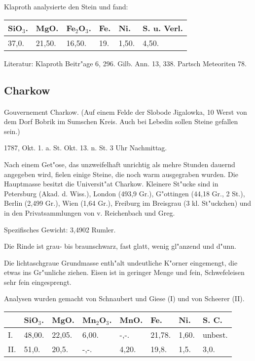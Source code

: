 \documentclass[a4paper, 11pt, oneside]{article}
\begin{document}
Klaproth analysierte den Stein und fand:
\begin{table}[!ht]
    \centering
    \begin{tabular}{l l l l l l}
        SiO$_{3}$. & MgO. & Fe$_{2}$O$_{3}$. & Fe. & Ni. & S. u. Verl. \\ \hline
        37,0. & 21,50. & 16,50. & 19. & 1,50. & 4,50. \\
    \end{tabular}
\end{table}

\footnotesize
Literatur: Klaproth Beitr"age 6, 296. Gilb. Ann. 13, 338. Partsch Meteoriten 78.
\subsection{Charkow}
\normalsize
\paragraph{}
Gouvernement Charkow. (Auf einem Felde der Slobode Jigalowka, 10 Werst von dem Dorf Bobrik im Sumschen Kreis. Auch bei Lebedin sollen Steine gefallen sein.)

1787, Okt. 1. a. St. Okt. 13. n. St. 3 Uhr Nachmittag.

Nach einem Get"ose, das unzweifelhaft unrichtig als mehre Stunden dauernd angegeben wird, fielen einige Steine, die noch warm ausgegraben wurden. Die Hauptmasse besitzt die Universit"at Charkow. Kleinere St"ucke sind in Petersburg (Akad. d. Wiss.), London (493,9 Gr.), G"ottingen (44,18 Gr., 2 St.), Berlin (2,499 Gr.), Wien (1,64 Gr.), Freiburg im Breisgrau (3 kl. St"uckchen) und in den Privatsammlungen von v. Reichenbach und Greg.

Spezifisches Gewicht: 3,4902 Rumler.

Die Rinde ist grau- bis braunschwarz, fast glatt, wenig gl"anzend und d"unn.

Die lichtaschgraue Grundmasse enth"alt undeutliche K"orner eingemengt, die etwas ins Gr"unliche ziehen. Eisen ist in geringer Menge und fein, Schwefeleisen sehr fein eingesprengt.

Analysen wurden gemacht von Schnaubert und Giese (I) und von Scheerer (II).
\begin{table}[!ht]
    \centering
    \begin{tabular}{l l l l l l l l}
         & SiO$_{3}$. & MgO. & Mn$_{2}$O$_{3}$. & MnO. & Fe. & Ni. & S. C. \\ \hline
        I. & 48,00. & 22,05. & 6,00. & -,-. & 21,78. & 1,60. & unbest. \\
        II. & 51,0. & 20,5. & -,-. & 4,20. & 19,8. & 1,5. & 3,0. \\
    \end{tabular}
\end{table}
\end{document}
